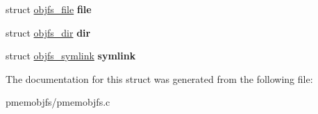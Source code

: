 \begin{DoxyCompactItemize}
\mbox{\label{structobjfs__inode_a5279adfa9fcb59740e78af79d356ed3a}} 
struct \hyperlink{structobjfs__file}{objfs\+\_\+file} {\bfseries file}
\item 
\mbox{\label{structobjfs__inode_ab583b9fa36be536e610ca7bbbdbeea78}} 
struct \hyperlink{structobjfs__dir}{objfs\+\_\+dir} {\bfseries dir}
\item 
\mbox{\label{structobjfs__inode_adaccb6d3ae28dd49dd9a7a9607c3ebe7}} 
struct \hyperlink{structobjfs__symlink}{objfs\+\_\+symlink} {\bfseries symlink}
\end{DoxyCompactItemize}


The documentation for this struct was generated from the following file\+:\begin{DoxyCompactItemize}
\item 
pmemobjfs/pmemobjfs.\+c\end{DoxyCompactItemize}
